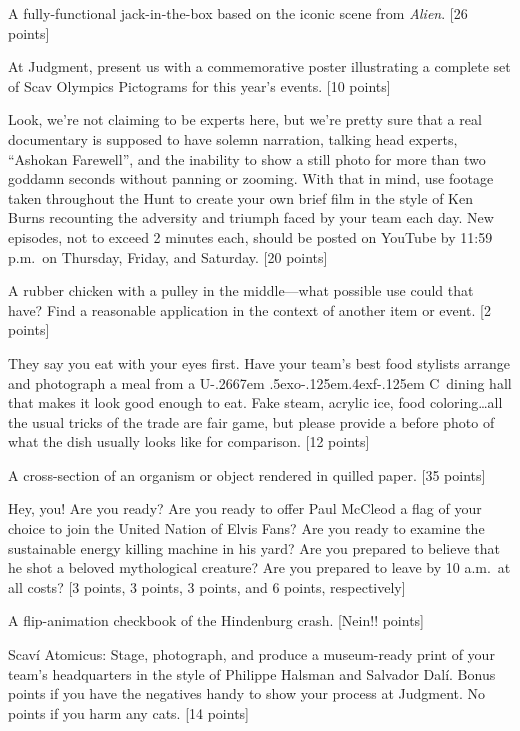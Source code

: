 \documentclass{book}
\def\UofC{U\kern-.2667em \lower.5ex\hbox{o}\kern-.125em\raise.4ex\hbox{f}\kern-.125em C}
\begin{document}
\begin{list}{}{}
\item A fully-functional jack-in-the-box based on the iconic scene from \emph{Alien}. [26 points]

\item At Judgment, present us with a commemorative poster illustrating a complete set of Scav Olympics Pictograms for this year's events. [10 points]

\item Look, we're not claiming to be experts here, but we're pretty sure that a real documentary is supposed to have solemn narration, talking head experts, ``Ashokan Farewell'', and the inability to show a still photo for more than two goddamn seconds without panning or zooming. With that in mind, use footage taken throughout the Hunt to create your own brief film in the style of Ken Burns recounting the adversity and triumph faced by your team each day. New episodes, not to exceed 2 minutes each, should be posted on YouTube by 11:59 p.m.\ on Thursday, Friday, and Saturday. [20 points]

\item A rubber chicken with a pulley in the middle---what possible use could that have? Find a reasonable application in the context of another item or event.  [2 points]

\item They say you eat with your eyes first. Have your team's best food stylists arrange and photograph a meal from a \UofC\ dining hall that makes it look good enough to eat. Fake steam, acrylic ice, food coloring\ldots all the usual tricks of the trade are fair game, but please provide a before photo of what the dish usually looks like for comparison. [12 points]

\item A cross-section of an organism or object rendered in quilled paper. [35 points]

\item Hey, you! Are you ready? Are you ready to offer Paul McCleod a flag of your choice to join the United Nation of Elvis Fans? Are you ready to examine the sustainable energy killing machine in his yard? Are you prepared to believe that he shot a beloved mythological creature? Are you prepared to leave by 10 a.m.\ at all costs? [3 points, 3 points, 3 points, and 6 points, respectively] 

\item A flip-animation checkbook of the Hindenburg crash. [Nein!! points]

\item Scav\'{i} Atomicus: Stage, photograph, and produce a museum-ready print of your team's headquarters in the style of Philippe Halsman and Salvador Dal\'{i}. Bonus points if you have the negatives handy to show your process at Judgment. No points if you harm any cats. [14 points] 


\end{list}
\end{document}
